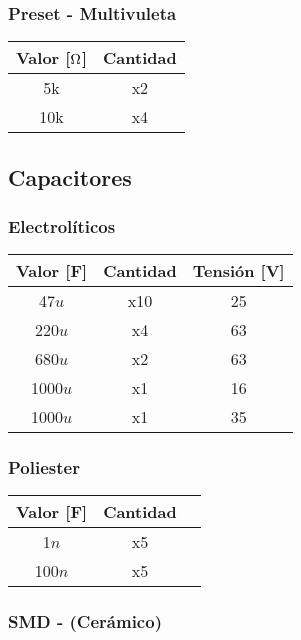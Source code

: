\documentclass[a4paper,11pt]{article}
\begin{document}
\subsubsection{Preset - Multivuleta}
\begin{table}[H]
\centering
\begin{tabular}{|c|c|}
\hline
Valor [$\ohm$] & Cantidad\\
\hline
5k   & x2   	\\
10k  & x4    \\
 \hline
\end{tabular}
\end{table}
\newpage
\subsection{Capacitores}
\subsubsection{Electrolíticos}

\begin{table}[h]
\centering
\begin{tabular}{|c|c|c|}
\hline
Valor [F] & Cantidad & Tensión [V]\\
\hline
47$u$   &  x10 & 25   	\\
220$u$  &  x4 & 63   	\\
680$u$  &  x2 & 63   	\\
1000$u$  &  x1 & 16   	\\
1000$u$  &  x1 & 35   	\\  
 \hline
\end{tabular}
\end{table}

\subsubsection{Poliester}

\begin{table}[h]
\centering
\begin{tabular}{|c|c|c|}
\hline
Valor [F] & Cantidad\\
\hline
1$n$   &  x5   	\\
100$n$  &  x5   	\\
 \hline
\end{tabular}
\end{table}

\subsubsection{SMD - (Cerámico)}
\end{document}
